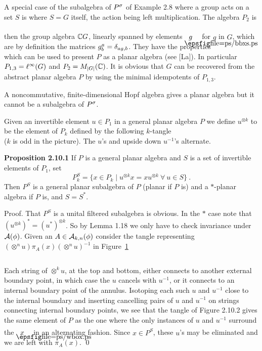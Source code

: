 \bs{}

A special case of the subalgebra of $P^\sigma$ of Example 2.8 where a
group acts on a set $S$ is where $S=G$ itself, the action being
left multiplication. The algebra $P_2$ is then the group algebra
$\Bbb C G$, linearly spanned by elements $\boxg{g}$ for $g$
in $G$, which are by definition the matrices
$g^a_b=\delta_{ag,b}$. They have the properties
\[
        
\]
\ni which can be used to present $P$ as a planar algebra (see
[La]). In particular $P_{1,3}=\ell^{\infty}(G)$ and $P_2=M_{|G|}(\Bbb
C)$. It is obvious that $G$ can be recovered from the abstract
planar algebra $P$ by using the minimal idempotents of $P_{1,3}$.

A noncommutative, finite-dimensional Hopf algebra  gives a planar
algebra but it cannot be a subalgebra of $P^\sigma$.

 Given an
invertible element $u\in P_1$ in a general planar algebra $P$ we
define $u^{\otimes k}$ to be the element of $P_k$ defined by the
following $k$-tangle
\[
        
\]
($k$ is odd in the picture). The $u$'s and upside down $u^{-1}$'s alternate.

\medskip
{\bf Proposition 2.10.1} If $P$ is a general planar algebra
and $S$ is a set of invertible elements of $P_1$, set
$$
P^S_k=\{x\in P_k\mid u^{\otimes k}x=xu^{\otimes k} \ \forall \
u\in S\} \ .
$$
Then $P^S$ is a general planar subalgebra of $P$ (planar if $P$ is)
and a $*$-planar algebra if $P$ is, and $S=S^*$.

\bigskip
{\sc Proof.} That $P^S$ is a unital filtered subalgebra is
obvious. In the $*$ case note that
$(u^{\otimes k})^*=(u^*)^{\otimes k}$. So by Lemma 1.18 we only
have to check invariance under ${\cal A}(\phi)$. Given an
$A\in{\cal A}_{k,n}(\phi)$ consider the tangle representing
$(\otimes^nu)\pi_A(x)(\otimes ^nu)^{-1}$ in Figure~\ref{pic66}

\begin{figure}[h]
\[
        
\]
\caption[2.10.2]{}\label{pic66}
\end{figure}
\ni Each string of $\otimes^ku$, at the top and bottom, either
connects to another external boundary point, in which case the $u$
cancels with $u^{-1}$, or it connects to an internal boundary
point of the annulus. Isotoping each such $u$ and $u^{-1}$ close to
the internal boundary and inserting cancelling pairs of $u$ and
$u^{-1}$ on strings connecting internal boundary points, we see
that the tangle of Figure 2.10.2 gives the same element of $P$ as
the one where the only instances of $u$ and $u^{-1}$ surround the
$\blankbox{x}$ in an alternating fashion.
Since $x\in P^S$, these $u$'s may be eliminated and we are left
with $\pi_A(x)$. \qed

